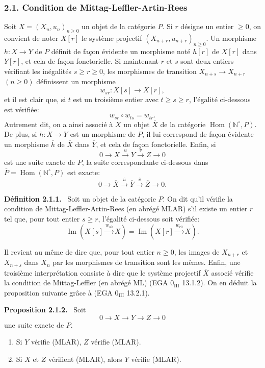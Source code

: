 \documentclass[11pt]{article}
\providecommand{\NN}{\mathbb{N}}
\newenvironment{statement}[1]{\par\medskip\noindent\textbf{#1.}\ }{\par\medskip}
\DeclareMathOperator{\Hom}{Hom}
\providecommand{\Hom}{\operatorname{Hom}}
\providecommand{\NN}{\mathbb N}
\providecommand{\Im}{\operatorname{Im}}
\renewcommand{\Im}{\operatorname{Im}}
\providecommand{\Im}{\operatorname{Im}}
\providecommand{\Hom}{\operatorname{Hom}}
\begin{document}
\subsubsection*{2.1. Condition de Mittag-Leffler-Artin-Rees}
Soit $X=(X_n,u_n)_{n\ge0}$ un objet de la catégorie $P$. Si $r$ désigne un entier $\ge0$, on convient de noter $X[r]$ le système projectif $(X_{n+r},u_{n+r})_{n\ge0}$. Un morphisme $h:X\to Y$ de $P$ définit de façon évidente un morphisme noté $h[r]$ de $X[r]$ dans $Y[r]$, et cela de façon fonctorielle. Si maintenant $r$ et $s$ sont deux entiers vérifiant les inégalités $s\ge r\ge0$, les morphismes de transition $X_{n+s}\to X_{n+r}$ $(n\ge0)$ définissent un morphisme
\[
w_{sr}:X[s]\longrightarrow X[r],
\]
et il est clair que, si $t$ est un troisième entier avec $t\ge s\ge r$, l'égalité ci-dessous est vérifiée:
\[
w_{sr}\circ w_{ts}=w_{tr}.
\]
Autrement dit, on a ainsi associé à $X$ un objet $\overline X$ de la catégorie $\Hom(\NN^\circ,P)$. De plus, si $h:X\to Y$ est un morphisme de $P$, il lui correspond de façon évidente un morphisme $\overline h$ de $\overline X$ dans $\overline Y$, et cela de façon fonctorielle. Enfin, si
\[
0\longrightarrow X\stackrel{u}{\longrightarrow}Y\stackrel{v}{\longrightarrow}Z\longrightarrow0
\]
est une suite exacte de $P$, la suite correspondante ci-dessous dans $\overline P=\Hom(\NN^\circ,P)$ est exacte:
\[
0\longrightarrow\overline X\stackrel{\overline u}{\longrightarrow}\overline Y\stackrel{\overline v}{\longrightarrow}\overline Z\longrightarrow0.
\]

\begin{statement}{Définition 2.1.1}
Soit un objet de la catégorie $P$. On dit qu'il vérifie la condition de Mittag-Leffler-Artin-Rees (en abrégé MLAR) s'il existe un entier $r$ tel que, pour tout entier $s\ge r$, l'égalité ci-dessous soit vérifiée:
\[
\Im(X[s]\xrightarrow{w_{s0}}X)=\Im(X[r]\xrightarrow{w_{r0}}X).
\]
\end{statement}
Il revient au même de dire que, pour tout entier $n\ge0$, les images de $X_{n+r}$ et $X_{n+s}$ dans $X_n$ par les morphismes de transition sont les mêmes. Enfin, une troisième interprétation consiste à dire que le système projectif $\overline X$ associé vérifie la condition de Mittag-Leffler (en abrégé ML) (EGA $0_{\mathrm{III}}$ 13.1.2). On en déduit la proposition suivante grâce à (EGA $0_{\mathrm{III}}$ 13.2.1).

\begin{statement}{Proposition 2.1.2}
Soit
\[
0\longrightarrow X\longrightarrow Y\longrightarrow Z\longrightarrow0
\]
une suite exacte de $P$.
\begin{enumerate}[label=(\roman*)]
\item Si $Y$ vérifie (MLAR), $Z$ vérifie (MLAR).
\item Si $X$ et $Z$ vérifient (MLAR), alors $Y$ vérifie (MLAR).
\end{enumerate}
\end{statement}
\end{document}
